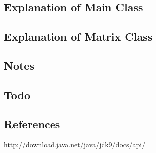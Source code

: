 \documentclass[12pt]{article}
\begin{document}
\newpage %



\begin{center}
\section{Explanation of Main Class}
\end{center}



\newpage %



\begin{center}
\section{Explanation of Matrix Class}
\end{center}



\newpage %



\begin{center}
\section{Notes}
\end{center}
\subsection{Todo}



\newpage %



\begin{center}
\section{References}
\end{center}
http://download.java.net/java/jdk9/docs/api/
\end{document}
